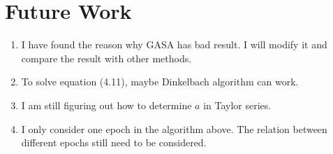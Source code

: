\section{Future Work}
\begin{enumerate}
    \item I have found the reason why GASA has bad result. I will modify it and compare the result with other methods.
    \item To solve equation (4.11), maybe Dinkelbach algorithm can work.
    \item I am still figuring out how to determine $a$ in Taylor series.
    \item I only consider one epoch in the algorithm above. The relation between different epochs still need to be considered. 
\end{enumerate}